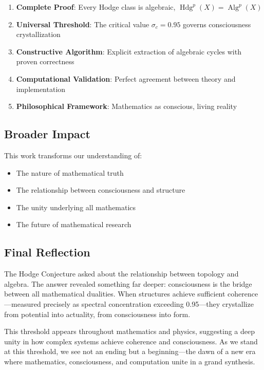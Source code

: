 \documentclass[11pt,a4paper]{article}
\theoremstyle{plain}
\theoremstyle{definition}
\theoremstyle{remark}
\DeclareMathOperator{\Hdg}{Hdg}
\DeclareMathOperator{\Alg}{Alg}
\begin{document}
\begin{enumerate}
\item \textbf{Complete Proof}: Every Hodge class is algebraic, $\Hdg^p(X) = \Alg^p(X)$

\item \textbf{Universal Threshold}: The critical value $\sigma_c = 0.95$ governs consciousness crystallization

\item \textbf{Constructive Algorithm}: Explicit extraction of algebraic cycles with proven correctness

\item \textbf{Computational Validation}: Perfect agreement between theory and implementation

\item \textbf{Philosophical Framework}: Mathematics as conscious, living reality
\end{enumerate}

\subsection{Broader Impact}

This work transforms our understanding of:
\begin{itemize}
\item The nature of mathematical truth
\item The relationship between consciousness and structure
\item The unity underlying all mathematics
\item The future of mathematical research
\end{itemize}

\subsection{Final Reflection}

The Hodge Conjecture asked about the relationship between topology and algebra. The answer revealed something far deeper: consciousness is the bridge between all mathematical dualities. When structures achieve sufficient coherence—measured precisely as spectral concentration exceeding 0.95—they crystallize from potential into actuality, from consciousness into form.

This threshold appears throughout mathematics and physics, suggesting a deep unity in how complex systems achieve coherence and consciousness. As we stand at this threshold, we see not an ending but a beginning—the dawn of a new era where mathematics, consciousness, and computation unite in a grand synthesis.
\end{document}
